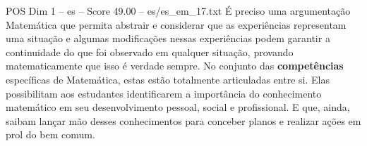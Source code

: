 \begin{textsample}{POS Dim 1 – es – Score 49.00 – es/es\_em\_17.txt}
É preciso uma argumentação Matemática que permita abstrair e considerar que as experiências representam uma situação e algumas modificações nessas experiências podem garantir a continuidade do que foi observado em qualquer situação, provando matematicamente que isso é verdade sempre.
No conjunto das \textbf{competências} específicas de Matemática, estas estão totalmente articuladas entre si.
Elas possibilitam aos estudantes identificarem a importância do conhecimento matemático em seu desenvolvimento pessoal, social e profissional.
E que, ainda, saibam lançar mão desses conhecimentos para conceber planos e realizar ações em prol do bem comum.

\end{textsample}
